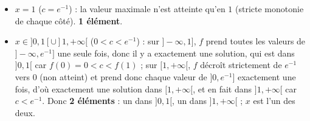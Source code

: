 \documentclass[11pt,a4paper]{article}
\begin{document}
\begin{corrige}
\begin{enumerate}
\begin{itemize}
				\item $x=1$ ($c=e^{-1}$) : la valeur maximale n'est atteinte qu'en $1$ (stricte monotonie de chaque côté). \textbf{1 élément}.
				\item $x\in]0,1[\cup]1,+\infty[$ ($0<c<e^{-1}$) : sur $]-\infty,1]$, $f$ prend toutes les valeurs de $]-\infty,e^{-1}]$ une seule fois, donc il y a exactement une solution, qui est dans $]0,1[$ car $f(0)=0<c<f(1)$ ; sur $[1,+\infty[$, $f$ décroît strictement de $e^{-1}$ vers $0$ (non atteint) et prend donc chaque valeur de $]0,e^{-1}]$ exactement une fois, d'où exactement une solution dans $[1,+\infty[$, et en fait dans $]1,+\infty[$ car $c<e^{-1}$. Donc \textbf{2 éléments} : un dans $]0,1[$, un dans $]1,+\infty[$ ; $x$ est l'un des deux.
			\end{itemize}
		\end{enumerate}
	\end{corrige}
	
\end{document}
